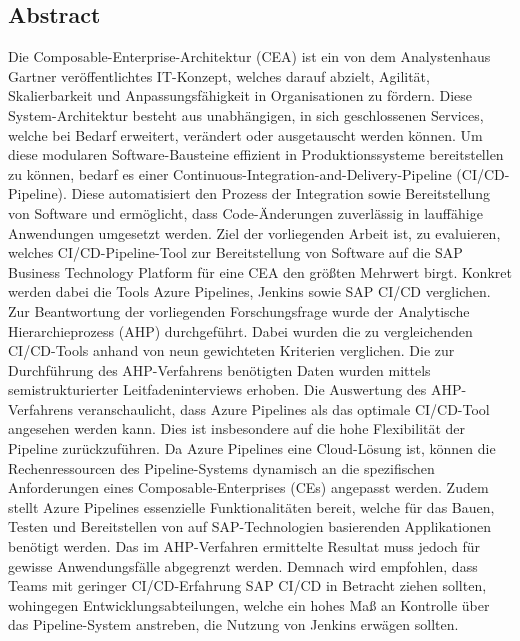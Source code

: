 \begin{center}
	\section*{Abstract}
\end{center}
Die Composable-Enterprise-Architektur (CEA) ist ein von dem Analystenhaus Gartner veröffentlichtes IT-Konzept, welches darauf abzielt, Agilität, Skalierbarkeit und Anpassungsfähigkeit in Organisationen zu fördern. Diese System-Architektur besteht aus unabhängigen, in sich geschlossenen Services, welche bei Bedarf erweitert, verändert oder ausgetauscht werden können. Um diese modularen Software-Bausteine effizient in Produktionssysteme bereitstellen zu können, bedarf es einer Continuous-Integration-and-Delivery-Pipeline (CI/CD-Pipeline). Diese automatisiert den Prozess der Integration sowie Bereitstellung von Software und ermöglicht, dass Code-Änderungen zuverlässig in lauffähige Anwendungen umgesetzt werden.
Ziel der vorliegenden Arbeit ist, zu evaluieren, welches CI/CD-Pipeline-Tool zur Bereitstellung von Software auf die SAP Business Technology Platform für eine CEA den größten Mehrwert birgt. Konkret werden dabei die Tools Azure Pipelines, Jenkins sowie SAP CI/CD verglichen. Zur Beantwortung der vorliegenden Forschungsfrage wurde der Analytische Hierarchieprozess (\acs{AHP}) durchgeführt. Dabei wurden die zu vergleichenden CI/CD-Tools anhand von neun gewichteten Kriterien verglichen. Die zur Durchführung des AHP-Verfahrens benötigten Daten wurden mittels semistrukturierter Leitfadeninterviews erhoben. Die Auswertung des AHP-Verfahrens veranschaulicht, dass Azure Pipelines als das optimale CI/CD-Tool angesehen werden kann. Dies ist insbesondere auf die hohe Flexibilität der Pipeline zurückzuführen. Da Azure Pipelines eine Cloud-Lösung ist, können die Rechenressourcen des Pipeline-Systems dynamisch an die spezifischen Anforderungen eines Composable-Enterprises (CEs) angepasst werden. Zudem stellt Azure Pipelines essenzielle Funktionalitäten bereit, welche für das Bauen, Testen und Bereitstellen von auf SAP-Technologien basierenden Applikationen benötigt werden. Das im AHP-Verfahren ermittelte Resultat muss jedoch für gewisse Anwendungsfälle abgegrenzt werden. Demnach wird empfohlen, dass Teams mit geringer CI/CD-Erfahrung SAP CI/CD in Betracht ziehen sollten, wohingegen Entwicklungsabteilungen, welche ein hohes Maß an Kontrolle über das Pipeline-System anstreben, die Nutzung von Jenkins erwägen sollten.  